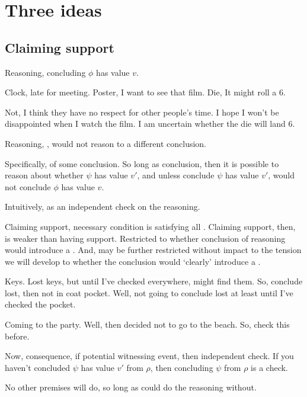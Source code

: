 \section{Three ideas}
\label{sec:three-pieces}

\subsection{Claiming support}
\label{sec:outline:claiming-support}

\begin{note}
  Reasoning, concluding \(\phi\) has value \(v\).

  Clock, late for meeting.
  Poster, I want to see that film.
  Die, It might roll a 6.

  Not, I think they have no respect for other people's time.
  I hope I won't be disappointed when I watch the film.
  I am uncertain whether the die will land 6.
\end{note}

\begin{note}
  Reasoning, \support{}, would not reason to a different conclusion.

  Specifically, \requ{} of some conclusion.
  So long as conclusion, then it is possible to reason about whether \(\psi\) has value \(v'\), and unless conclude \(\psi\) has value \(v'\), would not conclude \(\phi\) has value \(v\).

  Intuitively, \requ{} as an independent check on the reasoning.

  Claiming support, necessary condition is satisfying all .
  Claiming support, then, is weaker than having support.
  Restricted to whether conclusion of reasoning would introduce a \requ{}.
  And, may be further restricted without impact to the tension we will develop to whether the conclusion would `clearly' introduce a \requ{}.

  Keys.
  Lost keys, but until I've checked everywhere, might find them.
  So, conclude lost, then not in coat pocket.
  Well, not going to conclude lost at least until I've checked the pocket.

  Coming to the party.
  Well, then decided not to go to the beach.
  So, check this before.
\end{note}

\begin{note}
  Now, consequence, if potential witnessing event, then independent check.
  If you haven't concluded \(\psi\) has value \(v'\) from \(\rho\), then concluding \(\psi\) from \(\rho\) is a check.

  No other premises will do, so long as could do the reasoning without.
\end{note}

